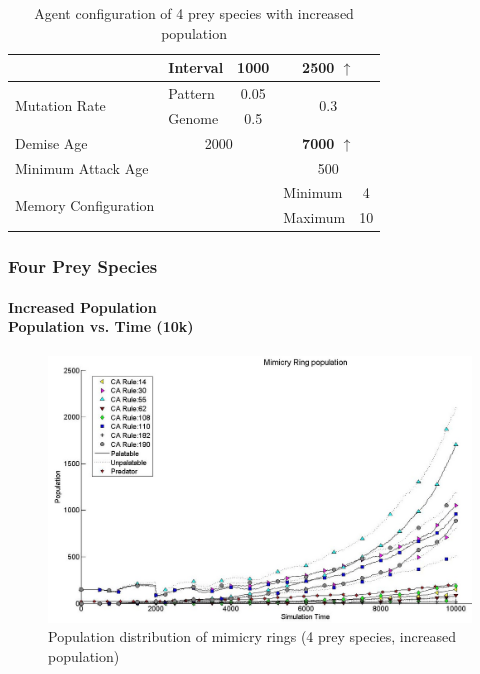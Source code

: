 {\begin{table}[H]
\begin{tiny}
\begin{spacing}{1.5}
\begin{tabular}{|l|l|c|c|l|c|}
	  						 									& Interval  & \multicolumn{2}{c|}{1000} & \multicolumn{2}{c|}{\textbf{2500 \(\uparrow\)}} \\ \hline
	  \multirow{2}{*}{Mutation Rate} & Pattern   & \multicolumn{2}{c|}{0.05} & \multicolumn{2}{c|}{\multirow{2}{*}{0.3}} \\ \cline{2-4}
	  						 									 & Genome    & \multicolumn{2}{c|}{0.5}  & \multicolumn{2}{c|}{} \\ \hline
	  Demise Age	 									 & \multicolumn{3}{c|}{2000}							& \multicolumn{2}{c|}{\textbf{7000 \(\uparrow\)}} \\ \hline
	  Minimum Attack Age						 & \multicolumn{3}{c|}{} 						    & \multicolumn{2}{c|}{500} \\ \hline
	  \multirow{2}{*}{Memory Configuration} & \multicolumn{3}{c|}{} 					& Minimum & 4 \\ \cline{5-6}
	   																			& \multicolumn{3}{c|}{} 					& Maximum & 10 \\ \hline  
	\end{tabular}
	\end{spacing}	
	\end{tiny}
	\caption{Agent configuration of 4 prey species with increased population}
	\label{tab:config-table-4-more-prey}
	\end{table}

}

\frame
{
	\frametitle{Four Prey Species}
	\framesubtitle{Increased Population\\ Population vs. Time (10k)}

	\begin{figure}[H]
		\centering
		\includegraphics[scale=0.25]{../tex/images/simTime10K-4MorePrey}
		\caption{Population distribution of mimicry rings (4 prey species, increased population)}
		\label{fig:plot-4-more-prey}
	\end{figure}	
}

